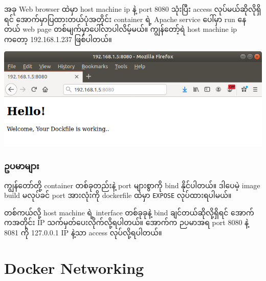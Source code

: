 အခု Web browser ထဲမှာ host machine ip နဲ့ port 8080 သုံးပြီး access
လုပ်မယ်ဆိုလိုရှိရင် အောက်မှာပြထားတယ်ပုံအတိုင်း container ရဲ့ Apache
service ပေါ်မှာ run နေတယ် web page တစ်မျက်မှာပေါ်လာပါလိမ့်မယ်။
ကျွန်တော့်ရဲ host machine ip ကတော့ 192.168.1.237 ဖြစ်ပါတယ်။

\includegraphics{.gitbook/assets/docker_file_and_docker_port.png}

\hypertarget{ux1025ux1015ux1019ux102cux1019ux103bux102cux1038}{%
\subsubsection{ဥပမာများ}\label{ux1025ux1015ux1019ux102cux1019ux103bux102cux1038}}

ကျွန်တော်တို့ container တစ်ခုတည်းနဲ့ port များစွာကို bind နိုင်ပါတယ်။
ဒါပေမဲ့ image build မလုပ်ခင် port အားလုံးကို dockerfile ထဲမှာ
\texttt{EXPOSE} လုပ်ထားရပါမယ်။

\begin{Shaded}
\begin{Highlighting}[]
\NormalTok{$ }
\end{Highlighting}
\end{Shaded}

တစ်ကယ်လို့ host machine ရဲ့ interface တစ်ခုခုနဲ့ bind
ချင်တယ်ဆိုလို့ရှိရင် အောက်ကအတိုင်း IP သက်မှတ်ပေးလိုက်လို့ရပါတယ်။ အောက်က
ဉပမာအရ port 8080 နဲ့ 8081 ကို 127.0.0.1 IP နဲ့သာ access လုပ်လို့ရပါတယ်။

\begin{Shaded}
\begin{Highlighting}[]
\NormalTok{$ }
\NormalTok{$ }
\end{Highlighting}
\end{Shaded}

\pagebreak

\hypertarget{docker-networking}{%
\section{Docker Networking}\label{docker-networking}}

